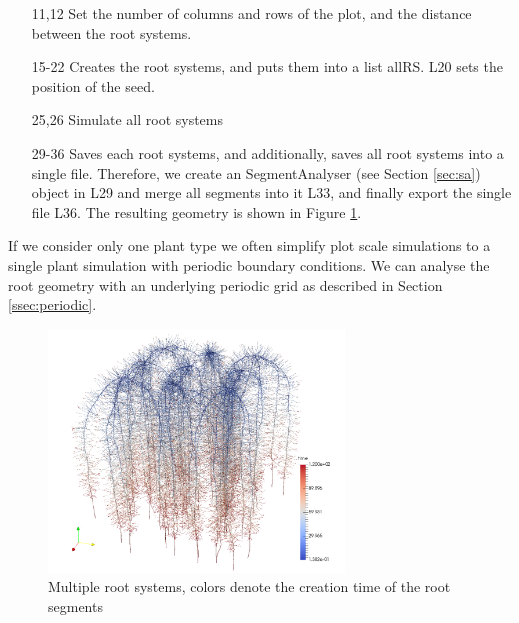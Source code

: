\begin{itemize}

\item[11,12] Set the number of columns and rows of the plot, and the distance between the root systems.

\item[15-22] Creates the root systems, and puts them into a list allRS. L20 sets the position of the seed. 

\item[25,26] Simulate all root systems 

\item[29-36] Saves each root systems, and additionally, saves all root systems into a single file. 
Therefore, we create an SegmentAnalyser (see Section \ref{sec:sa}) object in L29 and merge all segments into it L33, 
and finally export the single file L36. The resulting geometry is shown in Figure \ref{fig:multiple}.

\end{itemize}

If we consider only one plant type we often simplify plot scale simulations to a single plant simulation with periodic boundary conditions. We can analyse the root geometry with an underlying periodic grid as described in Section \ref{ssec:periodic}. 

\begin{figure}
\centering
\includegraphics[width=0.7\textwidth]{example_2b.png}
\caption{Multiple root systems, colors denote the creation time of the root segments} \label{fig:multiple}
\end{figure}

